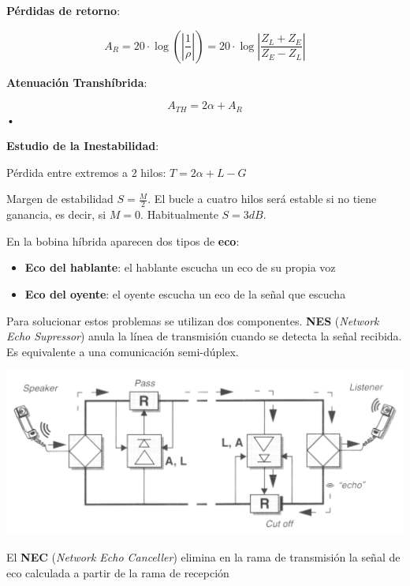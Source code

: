 \documentclass[10pt,portrait, twocolumn]{article}
\begin{document}
\textbf{Pérdidas de retorno}:

	\begin{equation*}
		A_{R} =  20 \cdot \log(\left| \frac{1}{\rho} \right| ) = 20 \cdot \log \left| \frac{Z_{L} + Z_{E}}{Z_{E} - Z_{L}} \right|
	\end{equation*}

\textbf{Atenuación Transhíbrida}:

	\begin{equation}
		A_{TH} = 2 \alpha + A_{R}
	\end{equation}•
	
\textbf{Estudio de la Inestabilidad}:	
	
Pérdida entre extremos a 2 hilos: $T = 2 \alpha + L - G$

Margen de estabilidad $S = \frac{M}{2}$. El bucle a cuatro hilos será estable si no tiene ganancia, es decir, si $M = 0$. Habitualmente $S = 3 dB$.	
	
En la bobina híbrida aparecen dos tipos de \textbf{eco}:

	\begin{itemize}
		\item \textbf{Eco del hablante}: el hablante escucha un eco de su propia voz
		\item \textbf{Eco del oyente}: el oyente escucha un eco de la señal que escucha
	\end{itemize}
	
Para solucionar estos problemas se utilizan dos componentes. \textbf{NES} (\textit{Network Echo Supressor}) anula la línea de transmisión cuando se detecta la señal recibida. Es equivalente a una comunicación semi-dúplex.
	
	\begin{center}
		\includegraphics[scale=0.2]{images/NES}
	\end{center}
	
El \textbf{NEC} (\textit{Network Echo Canceller}) elimina en la rama de transmisión la señal de eco calculada a partir de la rama de recepción
\end{document}
